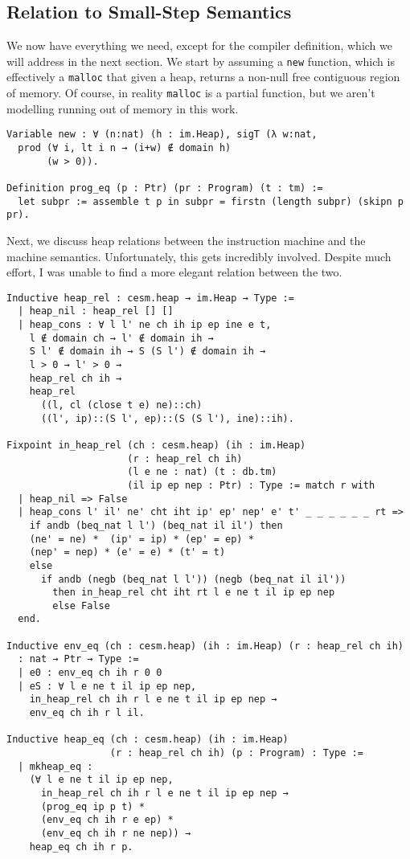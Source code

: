 \subsection{Relation to Small-Step Semantics}

We now have everything we need, except for the compiler definition, which we
will address in the next section. We start by assuming a \texttt{new} function,
which is effectively a \texttt{malloc} that given a heap, returns a non-null
free contiguous region of memory. Of course, in reality \texttt{malloc} is a
partial function, but we aren't modelling running out of memory in this work. 

\begin{verbatim}
Variable new : ∀ (n:nat) (h : im.Heap), sigT (λ w:nat, 
  prod (∀ i, lt i n → (i+w) ∉ domain h)
       (w > 0)).

Definition prog_eq (p : Ptr) (pr : Program) (t : tm) := 
  let subpr := assemble t p in subpr = firstn (length subpr) (skipn p pr).
\end{verbatim}

Next, we discuss heap relations between the instruction machine and the \ce \\
machine semantics. Unfortunately, this gets incredibly involved. Despite much
effort, I was unable to find a more elegant relation between the two.

\begin{verbatim}
Inductive heap_rel : cesm.heap → im.Heap → Type := 
  | heap_nil : heap_rel [] [] 
  | heap_cons : ∀ l l' ne ch ih ip ep ine e t, 
    l ∉ domain ch → l' ∉ domain ih → 
    S l' ∉ domain ih → S (S l') ∉ domain ih →
    l > 0 → l' > 0 → 
    heap_rel ch ih → 
    heap_rel 
      ((l, cl (close t e) ne)::ch) 
      ((l', ip)::(S l', ep)::(S (S l'), ine)::ih).

Fixpoint in_heap_rel (ch : cesm.heap) (ih : im.Heap)
                     (r : heap_rel ch ih)
                     (l e ne : nat) (t : db.tm) 
                     (il ip ep nep : Ptr) : Type := match r with
  | heap_nil => False
  | heap_cons l' il' ne' cht iht ip' ep' nep' e' t' _ _ _ _ _ _ rt => 
    if andb (beq_nat l l') (beq_nat il il') then
    (ne' = ne) *  (ip' = ip) * (ep' = ep) * 
    (nep' = nep) * (e' = e) * (t' = t)
    else 
      if andb (negb (beq_nat l l')) (negb (beq_nat il il'))
        then in_heap_rel cht iht rt l e ne t il ip ep nep
        else False
  end.

Inductive env_eq (ch : cesm.heap) (ih : im.Heap) (r : heap_rel ch ih)
  : nat → Ptr → Type :=
  | e0 : env_eq ch ih r 0 0 
  | eS : ∀ l e ne t il ip ep nep, 
    in_heap_rel ch ih r l e ne t il ip ep nep →
    env_eq ch ih r l il.

Inductive heap_eq (ch : cesm.heap) (ih : im.Heap) 
                  (r : heap_rel ch ih) (p : Program) : Type := 
  | mkheap_eq : 
    (∀ l e ne t il ip ep nep, 
      in_heap_rel ch ih r l e ne t il ip ep nep →
      (prog_eq ip p t) * 
      (env_eq ch ih r e ep) * 
      (env_eq ch ih r ne nep)) → 
    heap_eq ch ih r p.

\end{verbatim}

